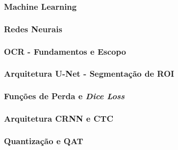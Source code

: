 \subsubsection{Machine Learning}


\subsubsection{Redes Neurais}


\subsubsection{OCR - Fundamentos e Escopo}


\subsubsection{Arquitetura U-Net - Segmentação de ROI}


\subsubsection{Funções de Perda e \textit{Dice Loss}}
\label{subsubsec:funcao_perda}


\subsubsection{Arquitetura CRNN e CTC}
\label{subsubsec:crnn_ctc}


\subsubsection{Quantização e QAT}


